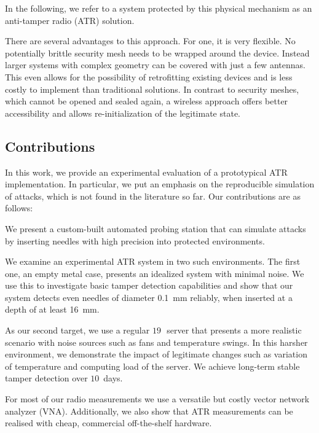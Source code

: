 \documentclass[conference]{IEEEtran}
\newcommand{\inch}{\,\textquotedbl}
\begin{document}
In the following, we refer to a system protected by this physical mechanism as an anti-tamper radio (ATR) solution.


There are several advantages to this approach. For one, it is very flexible. No potentially brittle security mesh needs to be wrapped around the device. Instead larger systems with complex geometry can be covered with just a few antennas. This even allows for the possibility of retrofitting existing devices and is less costly to implement than traditional solutions. In contrast to security meshes, which cannot be opened and sealed again, a wireless approach offers better accessibility and allows re-initialization of the legitimate state.



\subsection{Contributions}
In this work, we provide an experimental evaluation of a prototypical ATR implementation. In particular, we put an emphasis on the reproducible simulation of attacks, which is not found in the literature so far. Our contributions are as follows:

\begin{compactitem}
    \item We present a custom-built automated probing station that can simulate attacks by inserting needles with high precision into protected environments.
    \item We examine an experimental ATR system in two such environments. The first one, an empty metal case, presents an idealized system with minimal noise. We use this to investigate basic tamper detection capabilities and show that our system detects even needles of diameter \SI{0.1}{mm} reliably, when inserted at a depth of at least \SI{16}{\mm}. 
    \item As our second target, we use a regular $19$\inch~server that presents a more realistic scenario with noise sources such as fans and temperature swings. In this harsher environment, we demonstrate the impact of legitimate changes such as variation of temperature and computing load of the server. We achieve long-term stable tamper detection over $10$~days.
    \item For most of our radio measurements we use a versatile but costly vector network analyzer (VNA). Additionally, we also show that ATR measurements can be realised with cheap, commercial off-the-shelf hardware.
    
    
\end{compactitem}
\end{document}
